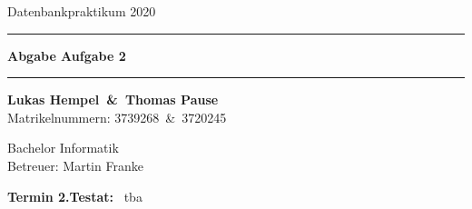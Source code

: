 \begin{titlepage}
    \begin{center}

        \vspace{\fill}
        \huge{Datenbankpraktikum 2020}\\

        \vspace{20pt}

        \hrule
        \vspace{26pt}
        \Huge \textbf{Abgabe Aufgabe 2}
        \vspace{20pt}
        \hrule

        \vspace{10pt}

        \vspace{\fill}
        \Large{\textbf{Lukas Hempel~\&~Thomas Pause}} %
        ~\\
        \Large{Matrikelnummern: 3739268~\&~3720245}

        \Large{Bachelor Informatik}
        ~\\
        \Large{Betreuer: Martin Franke}
        \vspace{\fill}

    \end{center}

    \begin{flushright}

        \Large{\textbf{Termin 2.Testat:}} ~\Large{tba}
    \end{flushright}

\end{titlepage}
